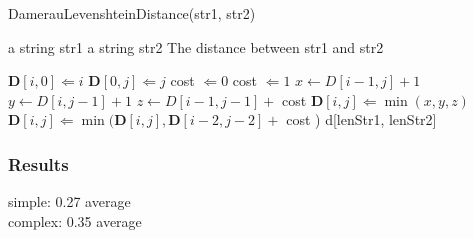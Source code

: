 \begin{algorithm}
\caption{DamerauLevenshteinDistance(str1, str2)}
\label{dameraulevenshtein}
\begin{algorithmic}
   \REQUIRE a string str1
   \REQUIRE a string str2
   \ENSURE The distance between str1 and str2

   \medskip

       \STATE $\mathbf{D}[i, 0] \Leftarrow i$
   \ENDFOR
       \STATE $\mathbf{D}[0, j] \Leftarrow j$
   \ENDFOR
				\STATE cost $\Leftarrow 0$
            \ELSE
				\STATE cost $\Leftarrow 1$
			\ENDIF
			\STATE $x \leftarrow D[i-1, j  ] + 1$ %
			\STATE $y \leftarrow D[i  , j-1] + 1$ %
            \STATE $z \leftarrow D[i-1, j-1] + $ cost %
            \STATE $\mathbf{D}[i, j] \Leftarrow \min(x, y, z)$
				\STATE $\mathbf{D}[i, j] \Leftarrow \min(
                	\mathbf{D}[i, j],
                    \mathbf{D}[i-2, j-2] + $ cost  %
                )
			\ENDIF
		\ENDFOR
	\ENDFOR
   \RETURN d[lenStr1, lenStr2]

\end{algorithmic}
\end{algorithm}
	
\subsubsection{Results}

simple: 0.27 average\\
complex: 0.35 average\\

